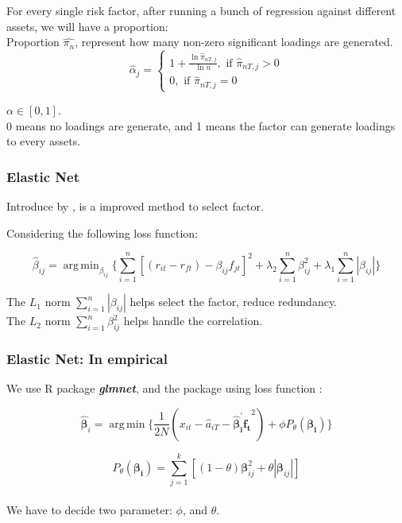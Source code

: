 \documentclass[12pt]{beamer}
\DeclareMathOperator*{\argmin}{arg\,min}
\begin{document}
\begin{frame}
	For every single risk factor, after running a bunch of regression against different assets, we will have a proportion:\\
 Proportion	$\hat{\pi_n}$, represent how many non-zero significant loadings are generated.\\
\[\hat{\alpha}_{j}=\left\{\begin{array}{l}
	1+\frac{\ln \hat{\pi}_{n T, j}}{\ln n}, \text { if } \hat{\pi}_{n T, j}>0 \\
	0, \text { if } \hat{\pi}_{n T, j}=0
\end{array}\right.\]

$\alpha \in [0,1]$.\\
0 means no loadings are generate, and 1 means the factor can generate loadings to every assets.
\end{frame}

	
\begin{frame}
\frametitle{Elastic Net}
Introduce by , is a improved method to select factor.

Considering the following loss function:

	\[   \hat{\beta}_{ij}  = \argmin_{\beta_{ij}}\{\sum_{i = 1}^{n}[(r_{it} - r_{ft}) - \beta_{ij }f_{jt}]^2 + \lambda_2\sum_{i = 1}^{n}\beta_{ij}^2  + \lambda_1\sum_{i = 1}^{n}|\beta_{ij}|     \}    \]
	
	The $L_1$ norm $\sum_{i = 1}^{n}|\beta_{ij}|$ helps select the factor, reduce redundancy.\\
    The $L_2$ norm $\sum_{i = 1}^{n}\beta_{ij}^2 $ helps handle the correlation.

\end{frame}

\begin{frame}
	\frametitle{Elastic Net: In empirical}
We use R package \textbf{\textit{glmnet}}, and the package using loss function \cite{Friedman2010}:
	
\[	\boldsymbol{\hat{\beta}}_{i} = \argmin \{ \frac{1}{2N} (x_{it}-\hat{a}_{iT} - \boldsymbol{\hat{\beta}_{i}^{\prime}f_t}^2 ) +\phi P_{\theta}(\boldsymbol{\beta_i})  \} \]

\[	P_{\theta}(\boldsymbol{\beta_i}) =\sum_{j=1}^k [ (1-\theta)\boldsymbol{\beta}_{ij}^2 + \theta |\boldsymbol{\beta}_{ij}|] \]\\
We have to decide two parameter: $\phi$, and $\theta$.

\end{frame}
\end{document}
